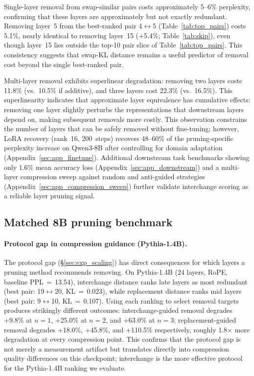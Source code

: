 \documentclass{article}
\begin{document}
Single-layer removal from swap-similar pairs costs approximately 5--6\% perplexity, confirming that these layers are approximately but not exactly redundant. Removing layer~5 from the best-ranked pair 4$\leftrightarrow$5 (Table~\ref{tab:top_pairs}) costs 5.1\%, nearly identical to removing layer~15 (+5.4\%; Table~\ref{tab:skip}), even though layer~15 lies outside the top-10 pair slice of Table~\ref{tab:top_pairs}. This consistency suggests that swap-KL distance remains a useful predictor of removal cost beyond the single best-ranked pair.

Multi-layer removal exhibits superlinear degradation: removing two layers costs 11.8\% (vs.\ 10.5\% if additive), and three layers cost 22.3\% (vs.\ 16.5\%). This superlinearity indicates that approximate layer equivalence has cumulative effects: removing one layer slightly perturbs the representations that downstream layers depend on, making subsequent removals more costly. This observation constrains the number of layers that can be safely removed without fine-tuning; however, LoRA recovery (rank~16, 200~steps) recovers 48--60\% of the pruning-specific perplexity increase on Qwen3-8B after controlling for domain adaptation (Appendix~\ref{sec:app_finetune}). Additional downstream task benchmarks showing only 1.6\% mean accuracy loss (Appendix~\ref{sec:app_downstream}) and a multi-layer compression sweep against random and anti-guided strategies (Appendix~\ref{sec:app_compression_sweep}) further validate interchange scoring as a reliable layer pruning signal.

\subsection{Matched 8B pruning benchmark}
\label{sec:exp_skip}
\FloatBarrier

\paragraph{Protocol gap in compression guidance (Pythia-1.4B).} The protocol gap (\S\ref{sec:exp_scaling}) has direct consequences for which layers a pruning method recommends removing. On Pythia-1.4B (24 layers, RoPE, baseline PPL\,$=$\,13.54), interchange distance ranks late layers as most redundant (best pair: 19$\leftrightarrow$20, KL\,$=$\,0.023), while replacement distance ranks mid layers (best pair: 9$\leftrightarrow$10, KL\,$=$\,0.107). Using each ranking to select removal targets produces strikingly different outcomes: interchange-guided removal degrades +9.8\% at $n{=}1$, +25.0\% at $n{=}2$, and +63.0\% at $n{=}3$; replacement-guided removal degrades +18.0\%, +45.8\%, and +110.5\% respectively, roughly 1.8$\times$ more degradation at every compression point. This confirms that the protocol gap is not merely a measurement artifact but translates directly into compression quality differences on this checkpoint; interchange is the more effective protocol for the Pythia-1.4B ranking we evaluate.
\end{document}
